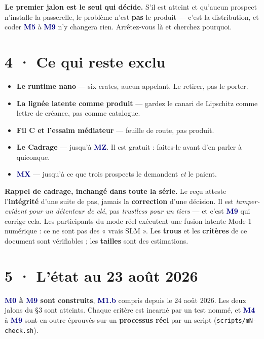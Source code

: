 \documentclass[10pt]{article}
\newcommand{\code}[1]{\texttt{\small #1}}
\newcommand{\mm}[1]{\textbf{\textcolor{navy}{#1}}}
\begin{document}
\begin{alerte}
\textbf{Le premier jalon est le seul qui décide.} S'il est atteint et qu'aucun prospect n'installe la
passerelle, le problème n'est \textbf{pas} le produit --- c'est la distribution, et coder \mm{M5} à
\mm{M9} n'y changera rien. Arrêtez-vous là et cherchez pourquoi.
\end{alerte}

\section{4 · Ce qui reste exclu}

\begin{itemize}[leftmargin=1.2em,itemsep=2pt,topsep=2pt]
\item \textbf{Le runtime nano} --- six crates, aucun appelant. Le retirer, pas le porter.
\item \textbf{La lignée latente comme produit} --- gardez le canari de Lipschitz comme lettre de
      créance, pas comme catalogue.
\item \textbf{Fil C et l'essaim médiateur} --- feuille de route, pas produit.
\item \textbf{Le Cadrage} --- jusqu'à \mm{MZ}. Il est gratuit : faites-le avant d'en parler à quiconque.
\item \textbf{\mm{MX}} --- jusqu'à ce que trois prospects le demandent \emph{et} le paient.
\end{itemize}

\begin{these}
\small\textbf{Rappel de cadrage, inchangé dans toute la série.} Le reçu atteste l'\textbf{intégrité}
d'une suite de pas, jamais la \textbf{correction} d'une décision. Il est \emph{tamper-evident pour un
détenteur de clé}, pas \emph{trustless pour un tiers} --- et c'est \mm{M9} qui corrige cela. Les
participants du mode réel exécutent une fusion latente Mode-1 numérique : ce ne sont pas des « vrais
SLM ». Les \textbf{trous} et les \textbf{critères} de ce document sont vérifiables ; les
\textbf{tailles} sont des estimations.
\end{these}

\section{5 · L'état au 23 août 2026}

\begin{acquis}
\textbf{\mm{M0} à \mm{M9} sont construits}, \mm{M1.b} compris depuis le 24 août 2026. Les deux
jalons du §3 sont atteints. Chaque critère est incarné par un test nommé, et \mm{M4} à \mm{M9} sont
en outre éprouvés sur un \textbf{processus réel} par un script (\code{scripts/mN-check.sh}).
\end{acquis}
\end{document}

